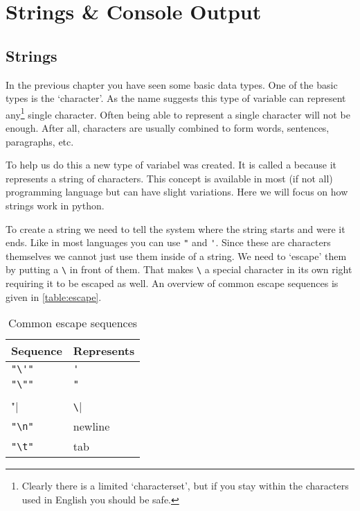  

\chapter{Strings \& Console Output}

	\section{Strings}
	
	In the previous chapter you have seen some basic data types.
	One of the basic types is the `character'.
	As the name suggests this type of variable can represent any\footnote{Clearly there is a limited `characterset', but if you stay within the characters used in English you should be safe.} single character.
	Often being able to represent a single character will not be enough.
	After all, characters are usually combined to form words, sentences, paragraphs, etc.
	
	To help us do this a new type of variabel was created. 
	It is called a \textbf{} because it represents a string of characters.
	This concept is available in most (if not all) programming language but can have slight variations. 
	Here we will focus on how strings work in python.
	
	To create a string we need to tell the system where the string starts and were it ends. 
	Like in most languages you can use \lstinline|"| and \lstinline|'|.
	Since these are characters themselves we cannot just use them inside of a string.
	We need to `escape' them by putting a \lstinline|\| in front of them.
	That makes \lstinline|\| a special character in its own right requiring it to be escaped as well.
	An overview of common escape sequences is given in \autoref{table:escape}.
	
	\begin{table}[htb]
		\centering
		\caption{Common escape sequences}\label{table:escape}
		\begin{tabular}{ l | l }
			Sequence	& Represents 	\\ \hline
			\lstinline|"\'"|	& \verb|'|	\\ \hline
			\lstinline|"\""|	& \verb|"|	\\ \hline
			\lstinline|"\\"|	& \verb|\|	\\ \hline
			\lstinline|"\n"|	& newline	\\ \hline
			\lstinline|"\t"|	& tab	\\
		\end{tabular}
	\end{table}
	
